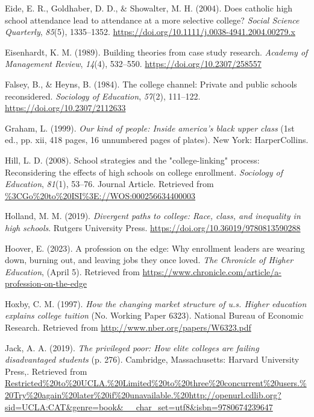 \documentclass[
  12pt,
]{article}
\newlength{\cslhangindent}
\newlength{\cslentryspacingunit} %
\newenvironment{CSLReferences}[2] %
 {%
  \setlength{\parindent}{0pt}
  \ifodd #1
  \let\oldpar\par
  \def\par{\hangindent=\cslhangindent\oldpar}
  \fi
  \setlength{\parskip}{#2\cslentryspacingunit}
 }%
 {}
\begin{document}
\begin{CSLReferences}{1}{0}
\leavevmode{}%
Eide, E. R., Goldhaber, D. D., \& Showalter, M. H. (2004). Does catholic high school attendance lead to attendance at a more selective college? \emph{Social Science Quarterly}, \emph{85}(5), 1335--1352. \url{https://doi.org/10.1111/j.0038-4941.2004.00279.x}

\leavevmode{}%
Eisenhardt, K. M. (1989). Building theories from case study research. \emph{Academy of Management Review}, \emph{14}(4), 532--550. \url{https://doi.org/10.2307/258557}

\leavevmode{}%
Falsey, B., \& Heyns, B. (1984). The college channel: Private and public schools reconsidered. \emph{Sociology of Education}, \emph{57}(2), 111--122. \url{https://doi.org/10.2307/2112633}

\leavevmode{}%
Graham, L. (1999). \emph{Our kind of people: Inside america's black upper class} (1st ed., pp. xii, 418 pages, 16 unnumbered pages of plates). New York: HarperCollins.

\leavevmode{}%
Hill, L. D. (2008). School strategies and the "college-linking" process: Reconsidering the effects of high schools on college enrollment. \emph{Sociology of Education}, \emph{81}(1), 53--76. Journal Article. Retrieved from \url{\%3CGo\%20to\%20ISI\%3E://WOS:000256634400003}

\leavevmode{}%
Holland, M. M. (2019). \emph{Divergent paths to college: Race, class, and inequality in high schools}. Rutgers University Press. \url{https://doi.org/10.36019/9780813590288}

\leavevmode{}%
Hoover, E. (2023). A profession on the edge: Why enrollment leaders are wearing down, burning out, and leaving jobs they once loved. \emph{The Chronicle of Higher Education}, (April 5). Retrieved from \url{https://www.chronicle.com/article/a-profession-on-the-edge}

\leavevmode{}%
Hoxby, C. M. (1997). \emph{How the changing market structure of u.s. Higher education explains college tuition} (No. Working Paper 6323). National Bureau of Economic Research. Retrieved from \url{http://www.nber.org/papers/W6323.pdf}

\leavevmode{}%
Jack, A. A. (2019). \emph{The privileged poor: How elite colleges are failing disadvantaged students} (p. 276). Cambridge, Massachusetts: Harvard University Press,. Retrieved from \url{Restricted\%20to\%20UCLA.\%20Limited\%20to\%20three\%20concurrent\%20users.\%20Try\%20again\%20later\%20if\%20unavailable.\%20http://openurl.cdlib.org?sid=UCLA:CAT\&genre=book\&__char_set=utf8\&isbn=9780674239647}


\end{CSLReferences}
\end{document}
